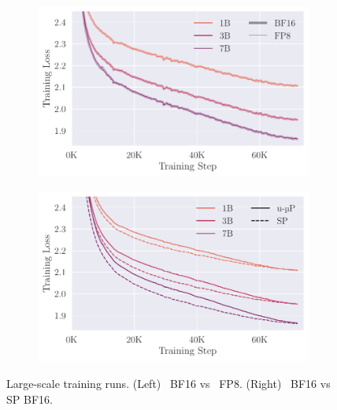 \begin{figure}[t]
    \vspace{-1.5em}
    \centering
    \begin{subfigure}{0.4\textwidth}
        \centering
        \includegraphics[width=\textwidth]{arXiv/figures/large_scale_BF16_vs_FP8.pdf}
    \end{subfigure}
    \hspace{2em}
    \begin{subfigure}{0.4\textwidth}
        \centering
        \includegraphics[width=\textwidth]{arXiv/figures/large_scale_umup_vs_sp.pdf}
    \end{subfigure}
    \vspace{-0.5em}
    \caption{Large-scale training runs. (Left) \umup\ BF16 vs \umup\ FP8. (Right) \umup\ BF16 vs SP BF16.}
    \label{fig:scaleup}
\end{figure}

